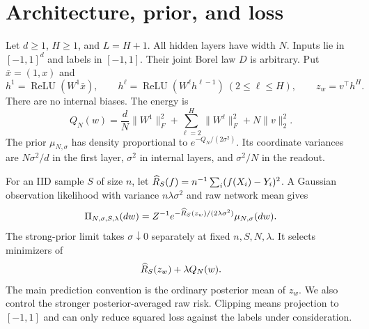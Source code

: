 \documentclass[11pt]{article}
\theoremstyle{remark}\newtheorem{remark}[theorem]{Remark}
\newcommand{\relu}{\operatorname{ReLU}}\newcommand{\clip}{\operatorname{clip}}
\begin{document}
\section{Architecture, prior, and loss}
Let $d\ge1$, $H\ge1$, and $L=H+1$. All hidden layers have width $N$. Inputs lie in $[-1,1]^d$ and labels in $[-1,1]$. Their joint Borel law $D$ is arbitrary. Put $\bar x=(1,x)$ and
\[
 h^1=\relu(W^1\bar x),\qquad
 h^\ell=\relu(W^\ell h^{\ell-1})\ (2\le\ell\le H),
 \qquad z_w=v^\top h^H.
\]
There are no internal biases. The energy is
\begin{equation}
 Q_N(w)=\frac dN\|W^1\|_F^2+\sum_{\ell=2}^H\|W^\ell\|_F^2+N\|v\|_2^2.
 \label{eq:energy}
\end{equation}
The prior $\mu_{N,\sigma}$ has density proportional to $e^{-Q_N/(2\sigma^2)}$. Its coordinate variances are $N\sigma^2/d$ in the first layer, $\sigma^2$ in internal layers, and $\sigma^2/N$ in the readout.

For an IID sample $S$ of size $n$, let $\widehat R_S(f)=n^{-1}\sum_i(f(X_i)-Y_i)^2$. A Gaussian observation likelihood with variance $n\lambda\sigma^2$ and raw network mean gives
\begin{equation}
 \Pi_{N,\sigma,S,\lambda}(dw)
 =Z^{-1}e^{-\widehat R_S(z_w)/(2\lambda\sigma^2)}\mu_{N,\sigma}(dw).
 \label{eq:posterior}
\end{equation}
The strong-prior limit takes $\sigma\downarrow0$ separately at fixed $n,S,N,\lambda$. It selects minimizers of
\begin{equation}
 \widehat R_S(z_w)+\lambda Q_N(w).
 \label{eq:objective}
\end{equation}
The main prediction convention is the ordinary posterior mean of $z_w$. We also control the stronger posterior-averaged raw risk. Clipping means projection to $[-1,1]$ and can only reduce squared loss against the labels under consideration.
\end{document}
